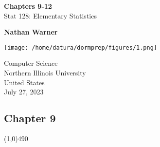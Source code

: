 \documentclass{report}
\title{\Huge{}}
\author{\huge{Nathan Warner}}
\date{\huge{}}
\begin{document}
        \begin{titlepage}
       \begin{center}
           \vspace*{1cm}
    
           \textbf{Chapters 9-12} \\
    
           \vspace{0.5cm}
           Stat 128: Elementary Statistics
            
                
           \vspace{1.5cm}
    
           \textbf{Nathan Warner}
    
           \vfill
                
                
           \vspace{0.8cm}
         
           \texttt{[image: /home/datura/dormprep/figures/1.png]}
                
           Computer Science \\
           Northern Illinois University\\
           United States\\
           July 27, 2023
           
                
       \end{center}
    \end{titlepage}
    \tableofcontents
    \pagebreak \bigbreak \noindent
    \begin{center}
        \section*{Chapter 9}
    \end{center}
    \line(1,0){490}
    \bigbreak \noindent 
\end{document}
